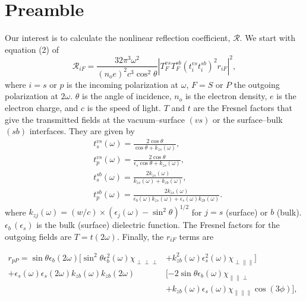 \documentclass{article}
\begin{document}
\section{Preamble}
Our interest is to calculate the nonlinear reflection coefficient, $\mathcal{R}$. We start with equation (2) of \cite{mejia_surface_2002}
\begin{equation}
\mathcal{R}_{iF} = \frac{32\pi^{3}\omega^{2}}{(n_{o}e)^{2}c^{3}\cos^{2}\theta}\left\vert T^{vs}_{F}T^{sb}_{F}(t^{vs}_{i}t^{sb}_{i})^{2}r_{iF}\right\vert^{2},
\end{equation}
where $i=s$ or $p$ is the incoming polarization at $\omega$, $F=S$ or $P$ the outgoing polarization at $2\omega$. $\theta$ is the angle of incidence, $n_{o}$ is the electron density, $e$ is the electron charge, and $c$ is the speed of light. $T$ and $t$ are the Fresnel factors that give the transmitted fields at the vacuum--surface $(vs)$ or the surface--bulk $(sb)$ interfaces. They are given by
\begin{align}
&t^{vs}_{s}(\omega) = \frac{2\cos\theta}{\cos\theta + k_{zs}(\omega)},\label{tvss}\\
&t^{vs}_{p}(\omega) = \frac{2\cos\theta}{\epsilon_{s}\cos\theta + k_{zs}(\omega)},\label{tvsp}\\
&t^{sb}_{s}(\omega) = \frac{2k_{zs}(\omega)}{k_{zs}(\omega) + k_{zb}(\omega)},\label{tsbs}\\
&t^{sb}_{p}(\omega) = \frac{2k_{zs}(\omega)}{\epsilon_{b}(\omega)k_{zs}(\omega) + \epsilon_{s}(\omega)k_{zb}(\omega)}.\label{tsbp}
\end{align}
where $k_{zj}(\omega) = (w/c)\times(\epsilon_{j}(\omega) - \sin^{2}\theta)^{1/2}$ for $j=s$ (surface) or $b$ (bulk). $\epsilon_{b}\,(\epsilon_{s})$ is the bulk (surface) dielectric function. The Fresnel factors for the outgoing fields are $T=t(2\omega)$. Finally, the $r_{iF}$ terms are

\begin{align}
r_{pP} = \sin\theta\epsilon_{b}(2\omega)[\sin^{2}\theta\epsilon^{2}_{b}(\omega)\chi_{\perp\perp\perp} &+ k^{2}_{zb}(\omega)\epsilon^{2}_{s}(\omega)\chi_{\perp\parallel\parallel}] \nonumber \\
+ \epsilon_{s}(\omega)\epsilon_{s}(2\omega)k_{zb}(\omega)k_{zb}(2\omega)&[-2\sin\theta\epsilon_{b}(\omega)\chi_{\parallel\parallel\perp}&\\
&+ k_{zb}(\omega)\epsilon_{s}(\omega)\chi_{\parallel\parallel\parallel}\cos(3\phi)], \nonumber
\end{align}
\end{document}
